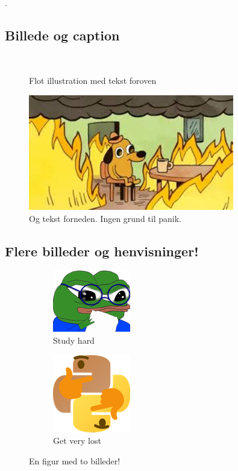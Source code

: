 \lipsum[5] \cite{einstein}. 

\subsection{Billede og caption}
\label{sec:1.1}
\lipsum[10]

\begin{figure}[H]
    \centering\
    \caption*{Flot illustration med tekst foroven}
    \includegraphics[width = 0.8\textwidth ]{figures/this_is_fine.png}
    \caption{Og tekst forneden. Ingen grund til panik. \cite{menabrea}}
    \label{fig:fine}
\end{figure}

\subsection{Flere billeder og henvisninger!}
\label{sec:1.2}

\begin{figure}[H]
\centering
\begin{subfigure}{.5\textwidth}
  \centering
  \includegraphics[width=.4\linewidth]{figures/pepe_study.png}
  \caption{Study hard}
  \label{fig:study}
\end{subfigure}%
\begin{subfigure}{.5\textwidth}
  \centering
  \includegraphics[width=.4\linewidth]{figures/pythonk.png}
  \caption{Get very lost}
  \label{fig:thonk}
\end{subfigure}
\caption{En figur med to billeder!}
\label{fig:two_img}
\end{figure}

